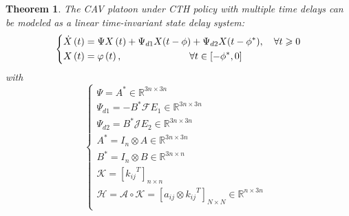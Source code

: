 \documentclass[a4paper]{cas-sc}
\newtheorem{theorem}{Theorem}
\begin{document}
\begin{theorem}
  The CAV platoon under CTH policy with multiple time delays can be modeled as a linear time-invariant state delay system:
  \begin{equation}
    \left\{ \begin{gathered}
      \dot X\left( t \right) = \Psi X\left( t \right) + {\Psi _{d1}}X(t - \phi ) + {\Psi _{d2}}X(t - {\phi ^*}),\quad \forall t \geqslant 0 \hfill \\
      X\left( t \right) = \varphi \left( t \right),\quad \quad \quad \quad \quad \quad \quad \forall t \in \left[ { - {\phi ^*},0} \right] \hfill \\
    \end{gathered}  \right.
    \label{eq13}
  \end{equation}
  with
  \begin{equation}
    \left\{ {\begin{array}{*{20}{l}}
          {\Psi  = {A^*} \in {\mathbb{R}^{3n \times 3n}}}                                                                                                                                     \\
          {{\Psi _{d1}} =  - {B^*}\mathcal{F}{E_1} \in {\mathbb{R}^{3n \times 3n}}{\text{ }}}                                                                                                 \\
          {{\Psi _{d2}} = {B^*}\mathcal{J}{E_2} \in {\mathbb{R}^{3n \times 3n}}{\text{ }}}                                                                                                    \\
          {{A^*} = {I_n} \otimes A \in {\mathbb{R}^{3n \times 3n}}}                                                                                                                           \\
          {{B^*} = {I_n} \otimes B \in {\mathbb{R}^{3n \times n}}}                                                                                                                            \\
          {\mathcal{K} = {{[{k_{ij}}^T]}_{n \times n}}{\text{ }}}                                                                                                                             \\
          {\mathcal{H} = {\mathcal{A} \circ }\mathcal{K} = {{[{a_{ij}} \otimes {k_{ij}}^T]}_{N \times N}} \in {\mathbb{R}^{n \times 3n}}{\text{ }}}                                           \\

\end{array}}
\end{equation}
\end{theorem}
\end{document}
